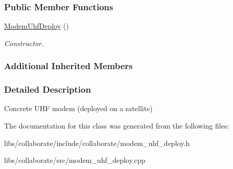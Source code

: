 \subsubsection*{Public Member Functions}
\begin{DoxyCompactItemize}
\item 
\mbox{\label{classosse_1_1collaborate_1_1_modem_uhf_deploy_a91e8e69f8a8cbaad00c874f24af2a0da}} 
\hyperlink{classosse_1_1collaborate_1_1_modem_uhf_deploy_a91e8e69f8a8cbaad00c874f24af2a0da}{Modem\+Uhf\+Deploy} ()
\begin{DoxyCompactList}\small\item\em Constructor. \end{DoxyCompactList}\end{DoxyCompactItemize}
\subsubsection*{Additional Inherited Members}


\subsubsection{Detailed Description}
Concrete U\+HF modem (deployed on a satellite) 

The documentation for this class was generated from the following files\+:\begin{DoxyCompactItemize}
\item 
libs/collaborate/include/collaborate/modem\+\_\+uhf\+\_\+deploy.\+h\item 
libs/collaborate/src/modem\+\_\+uhf\+\_\+deploy.\+cpp\end{DoxyCompactItemize}
